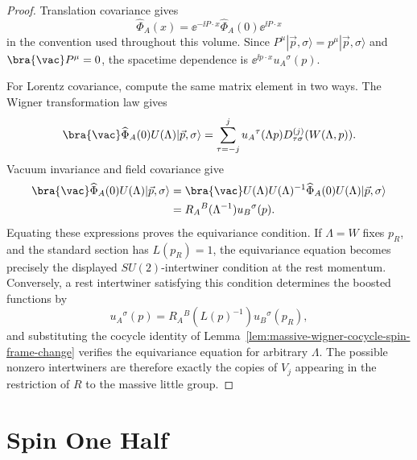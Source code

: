 \begin{proof}
Translation covariance gives
\[
  \widehat\Phi_A(x)=\ee^{-\ii P\cdot x}\widehat\Phi_A(0)\ee^{\ii P\cdot x}
\]
in the convention used throughout this volume.  Since
\(P^\mu|\vec p,\sigma\rangle=p^\mu|\vec p,\sigma\rangle\) and
\(\bra{\vac}P^\mu=0\), the spacetime dependence is
\(\ee^{\ii p\cdot x}u_A{}^\sigma(p)\).

For Lorentz covariance, compute the same matrix element in two ways.  The
Wigner transformation law gives
\[
  \bra{\vac}\widehat\Phi_A(0)U(\Lambda)|\vec p,\sigma\rangle
  =
  \sum_{\tau=-j}^{j}
  u_A{}^\tau(\Lambda p)D^{(j)}_{\tau\sigma}(W(\Lambda,p)).
\]
Vacuum invariance and field covariance give
\[
\begin{aligned}
  \bra{\vac}\widehat\Phi_A(0)U(\Lambda)|\vec p,\sigma\rangle
  &=
  \bra{\vac}U(\Lambda)
  U(\Lambda)^{-1}\widehat\Phi_A(0)U(\Lambda)|\vec p,\sigma\rangle\\
  &=
  R_A{}^B(\Lambda^{-1})u_B{}^\sigma(p).
\end{aligned}
\]
Equating these expressions proves the equivariance condition.  If
\(\Lambda=W\) fixes \(p_R\), and the standard section has \(L(p_R)=1\), the
equivariance equation becomes precisely the displayed \(SU(2)\)-intertwiner
condition at the rest momentum.  Conversely, a rest intertwiner satisfying this
condition determines the boosted functions by
\[
  u_A{}^\sigma(p)=R_A{}^B(L(p)^{-1})u_B{}^\sigma(p_R),
\]
and substituting the cocycle identity of
Lemma~\ref{lem:massive-wigner-cocycle-spin-frame-change} verifies the
equivariance equation for arbitrary \(\Lambda\).  The possible nonzero
intertwiners are therefore exactly the copies of \(V_j\) appearing in the
restriction of \(R\) to the massive little group.
\end{proof}

\section{Spin One Half}

